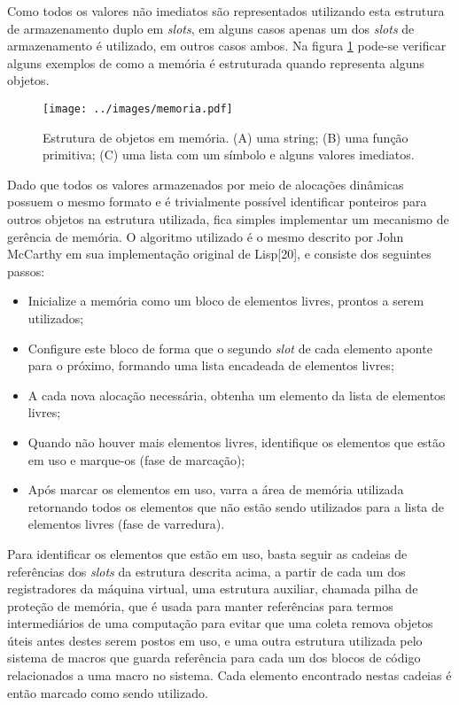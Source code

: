 Como todos os valores não imediatos são representados utilizando esta
estrutura de armazenamento duplo em \textit{slots}, em alguns casos apenas um dos \textit{slots}
de armazenamento é utilizado, em outros casos ambos. Na figura \ref{fig:memoria}
pode-se verificar alguns exemplos de como a memória é estruturada quando
representa alguns objetos.

\begin{figure}[h!]
\centering
\texttt{[image: ../images/memoria.pdf]}
\caption{Estrutura de objetos em memória. (A) uma string; (B) uma função
         primitiva; (C) uma lista com um símbolo e alguns valores imediatos.}
\label{fig:memoria}
\end{figure}

Dado que todos os valores armazenados por meio de alocações dinâmicas possuem o
mesmo formato e é trivialmente possível identificar ponteiros para outros
objetos na estrutura utilizada, fica simples implementar um mecanismo de
gerência de memória. O algoritmo utilizado é o mesmo descrito por John McCarthy
em sua implementação original de Lisp[20], e consiste dos seguintes passos:

\begin{itemize}

\item Inicialize a memória como um bloco de elementos livres, prontos a serem
utilizados;
 
\item Configure este bloco de forma que o segundo \textit{slot} de cada elemento aponte
para o próximo, formando uma lista encadeada de elementos livres;
 
\item A cada nova alocação necessária, obtenha um elemento da lista de
elementos livres;
 
\item Quando não houver mais elementos livres, identifique os elementos que
estão em uso e marque-os (fase de marcação);
 
\item Após marcar os elementos em uso, varra a área de memória utilizada
retornando todos os elementos que não estão sendo utilizados para a lista de
elementos livres (fase de varredura).

\end{itemize}

Para identificar os elementos que estão em uso, basta seguir as cadeias de
referências dos \textit{slots} da estrutura descrita acima, a partir de cada um
dos registradores da máquina virtual, uma estrutura auxiliar, chamada pilha de
proteção de memória, que é usada para manter referências para termos
intermediários de uma computação para evitar que uma coleta remova objetos
úteis antes destes serem postos em uso, e uma outra estrutura utilizada pelo 
sistema de macros que guarda referência para cada um dos blocos de código
relacionados a uma macro no sistema. Cada elemento encontrado nestas cadeias
é então marcado como sendo utilizado.


